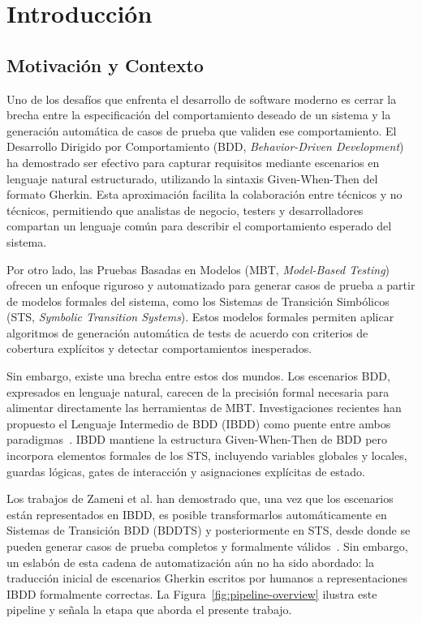 \chapter{Introducción}

\section{Motivación y Contexto}

Uno de los desafíos que enfrenta el desarrollo de software moderno es cerrar la brecha entre la especificación del comportamiento deseado de un sistema y la generación automática de casos de prueba que validen ese comportamiento. El Desarrollo Dirigido por Comportamiento (BDD, \textit{Behavior-Driven Development}) ha demostrado ser efectivo para capturar requisitos mediante escenarios en lenguaje natural estructurado, utilizando la sintaxis Given-When-Then del formato Gherkin. Esta aproximación facilita la colaboración entre técnicos y no técnicos, permitiendo que analistas de negocio, testers y desarrolladores compartan un lenguaje común para describir el comportamiento esperado del sistema.

Por otro lado, las Pruebas Basadas en Modelos (MBT, \textit{Model-Based Testing}) ofrecen un enfoque riguroso y automatizado para generar casos de prueba a partir de modelos formales del sistema, como los Sistemas de Transición Simbólicos (STS, \textit{Symbolic Transition Systems}). Estos modelos formales permiten aplicar algoritmos de generación automática de tests de acuerdo con criterios de cobertura explícitos y detectar comportamientos inesperados.

Sin embargo, existe una brecha entre estos dos mundos. Los escenarios BDD, expresados en lenguaje natural, carecen de la precisión formal necesaria para alimentar directamente las herramientas de MBT. Investigaciones recientes han propuesto el Lenguaje Intermedio de BDD (IBDD) como puente entre ambos paradigmas~\cite{zameni2024ibdd}. IBDD mantiene la estructura Given-When-Then de BDD pero incorpora elementos formales de los STS, incluyendo variables globales y locales, guardas lógicas, gates de interacción y asignaciones explícitas de estado.

Los trabajos de Zameni et al. han demostrado que, una vez que los escenarios están representados en IBDD, es posible transformarlos automáticamente en Sistemas de Transición BDD (BDDTS) y posteriormente en STS, desde donde se pueden generar casos de prueba completos y formalmente válidos~\cite{zameni2023bddts}. Sin embargo, un eslabón de esta cadena de automatización aún no ha sido abordado: la traducción inicial de escenarios Gherkin escritos por humanos a representaciones IBDD formalmente correctas. La Figura~\ref{fig:pipeline-overview} ilustra este pipeline y señala la etapa que aborda el presente trabajo.

